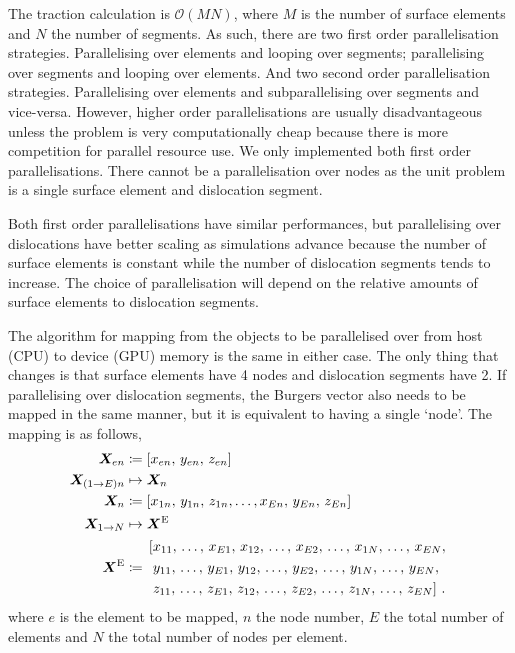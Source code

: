 The traction calculation is $\mathcal{O}(MN)$, where $M$ is the number of surface elements and $N$
the number of segments. As such, there are two first order parallelisation strategies. Parallelising over elements and looping over segments; parallelising over segments and looping over elements. And two second order parallelisation strategies. Parallelising over elements and subparallelising over segments and vice-versa. However, higher order parallelisations are usually disadvantageous unless the problem is very computationally cheap because there is more competition for parallel resource use. We only implemented both first order parallelisations. There cannot be a parallelisation over nodes as the unit problem is a single surface element and dislocation segment.

Both first order parallelisations have similar performances, but parallelising over dislocations have better scaling as simulations advance because the number of surface elements is constant while the number of dislocation segments tends to increase. The choice of parallelisation will depend on the relative amounts of surface elements to dislocation segments.

The algorithm for mapping from the objects to be parallelised over from host (CPU) to device (GPU) memory is the same in either case. The only thing that changes is that surface elements have 4 nodes and dislocation segments have 2. If parallelising over dislocation segments, the Burgers vector also needs to be mapped in the same manner, but it is equivalent to having a single `node'. The mapping is as follows,
\begin{subequations}\label{eq:hostDeviceElementMap}
    \begin{align}
        \vec{X}_{en}         & \coloneqq	\left[x_{en},\, y_{en},\, z_{en}\right]                                                     \\
        \vec{X}_{(1\to E)n}  & \mapsto 	\vec{X}_{n} \nn
        \vec{X}_{n}          & \coloneqq	\left[x_{1n},\, y_{1n},\, z_{1n},\ldots,x_{En},\, y_{En},\, z_{En}\right]\label{seq:xn_arr} \\
        \vec{X}_{1\to N}     & \mapsto	\vec{X}^{\textrm{E}}\nn
        \vec{X}^{\textrm{E}} & \coloneqq
        \begin{aligned}
             & \left[x_{11},\, \ldots,\, x_{E1},\, x_{12},\, \ldots,\, x_{E2},\, \ldots,\, x_{1N},\, \ldots,\, x_{EN}, \right.      \\
             & \left.\,y_{11},\, \ldots,\, y_{E1},\, y_{12},\, \ldots,\, y_{E2},\, \ldots,\, y_{1N},\, \ldots,\, y_{EN}, \right.    \\
             & \left.\,z_{11},\, \ldots,\, z_{E1},\, z_{12},\, \ldots,\, z_{E2},\, \ldots,\, z_{1N},\, \ldots,\, z_{EN}  \right]\,.
        \end{aligned}
    \end{align}
\end{subequations}
where $ e $ is the element to be mapped, $ n $ the node number, $ E $ the total number of elements and $N$ the total number of nodes per element.

